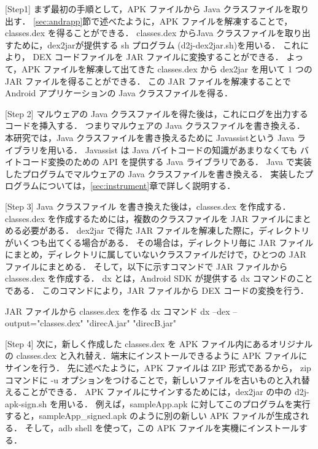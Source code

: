 [Step1] まず最初の手順として，APK ファイルから Java クラスファイルを取り出す．
\ref{sec:andrapp}節で述べたように，APK ファイルを解凍することで，classes.dex を得ることができる．
classes.dex からJava クラスファイルを取り出すために，dex2jar\cite{d2jar}が提供する sh プログラム (d2j-dex2jar.sh)を用いる．
これにより， DEX コードファイルを JAR ファイルに変換することができる．
よって，APK ファイルを解凍して出てきた classes.dex から dex2jar を用いて 1 つの JAR ファイルを得ることができる．
この JAR ファイルを解凍することで Android アプリケーションの Java クラスファイルを得る．

[Step 2] マルウェアの Java クラスファイルを得た後は，これにログを出力するコードを挿入する．
つまりマルウェアの Java クラスファイルを書き換える．
本研究では，Java クラスファイルを書き換えるために Javassist\cite{javassist}という Java ライブラリを用いる．
Javassist は Java バイトコードの知識があまりなくても バイトコード変換のための API を提供する Java ライブラリである．
Java で実装したプログラムでマルウェアの Java クラスファイルを書き換える．
実装したプログラムについては，\ref{sec:instrument}章で詳しく説明する．

[Step 3] Java クラスファイル を書き換えた後は，classes.dex を作成する．
classes.dex を作成するためには，複数のクラスファイルを JAR ファイルにまとめる必要がある．
dex2jar で得た JAR ファイルを解凍した際に，ディレクトリがいくつも出てくる場合がある．
その場合は，ディレクトリ毎に JAR ファイルにまとめ，ディレクトリに属していないクラスファイルだけで，ひとつの JAR ファイルにまとめる． 
そして，以下に示すコマンドで JAR ファイルから classes.dex を作成する．
dx とは，Android SDK が提供する dx コマンドのことである．
このコマンドにより，JAR ファイルから DEX コードの変換を行う．

\begin{itembox}[c]{JAR ファイルから classes.dex を作る dx コマンド}
	dx --dex --output="classes.dex" "direcA.jar" "direcB.jar" 
\end{itembox}

[Step 4] 次に，新しく作成した classes.dex を APK ファイル内にあるオリジナルの classes.dex と入れ替え．端末にインストールできるように APK ファイルにサインを行う．
先に述べたように，APK ファイルは ZIP 形式であるから， zip コマンドに -u オプションをつけることで，新しいファイルを古いものと入れ替えることができる．
APK ファイルにサインするためには，dex2jar の中の d2j-apk-sign.sh を用いる．
例えば，sampleApp.apk に対してこのプログラムを実行すると，sampleApp\_signed.apk のように別の新しい APK ファイルが生成される．
そして，adb shell を使って，この APK ファイルを実機にインストールする．


